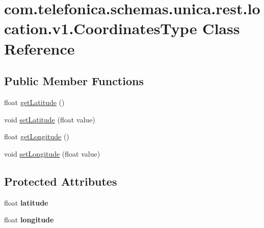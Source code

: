 \hypertarget{classcom_1_1telefonica_1_1schemas_1_1unica_1_1rest_1_1location_1_1v1_1_1CoordinatesType}{
\section{com.telefonica.schemas.unica.rest.location.v1.CoordinatesType Class Reference}
\label{classcom_1_1telefonica_1_1schemas_1_1unica_1_1rest_1_1location_1_1v1_1_1CoordinatesType}
}
\subsection*{Public Member Functions}
\begin{DoxyCompactItemize}
\item 
float \hyperlink{classcom_1_1telefonica_1_1schemas_1_1unica_1_1rest_1_1location_1_1v1_1_1CoordinatesType_a7f142f4f351c5ca2eea94c432be5068b}{getLatitude} ()
\item 
void \hyperlink{classcom_1_1telefonica_1_1schemas_1_1unica_1_1rest_1_1location_1_1v1_1_1CoordinatesType_a3914579ee58a6da23f09d96b8e2d570e}{setLatitude} (float value)
\item 
float \hyperlink{classcom_1_1telefonica_1_1schemas_1_1unica_1_1rest_1_1location_1_1v1_1_1CoordinatesType_a9951b02271859936975c3d3fa90c2c97}{getLongitude} ()
\item 
void \hyperlink{classcom_1_1telefonica_1_1schemas_1_1unica_1_1rest_1_1location_1_1v1_1_1CoordinatesType_a57a068f380012e017c1f38713c22fc81}{setLongitude} (float value)
\end{DoxyCompactItemize}
\subsection*{Protected Attributes}
\begin{DoxyCompactItemize}
\item 
\hypertarget{classcom_1_1telefonica_1_1schemas_1_1unica_1_1rest_1_1location_1_1v1_1_1CoordinatesType_af567572b59878aef9d926d40e5447939}{
float {\bfseries latitude}}
\label{classcom_1_1telefonica_1_1schemas_1_1unica_1_1rest_1_1location_1_1v1_1_1CoordinatesType_af567572b59878aef9d926d40e5447939}

\item 
\hypertarget{classcom_1_1telefonica_1_1schemas_1_1unica_1_1rest_1_1location_1_1v1_1_1CoordinatesType_a919f5e38de2bce1644311eebaecdd04d}{
float {\bfseries longitude}}
\label{classcom_1_1telefonica_1_1schemas_1_1unica_1_1rest_1_1location_1_1v1_1_1CoordinatesType_a919f5e38de2bce1644311eebaecdd04d}

\end{DoxyCompactItemize}


